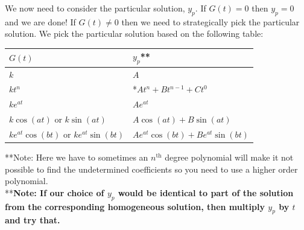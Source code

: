 We now need to consider the particular solution, $y_p$. If $G(t)=0$ then $y_p=0$ and we are done! If $G(t) \neq 0$ then we need to strategically pick the particular solution. We pick the particular solution based on the following table:

\begin{center}
{\renewcommand{\arraystretch}{2}
\begin{tabular}{|l|l|}
\hline
\Large{$G(t)$} & \Large{$y_p$}** \\ \hline
$k$ & $A$ \\ \hline
$kt^n$ & *$At^n+Bt^{n-1}+Ct^0$ \\ \hline
$ke^{at}$ & $Ae^{at}$ \\ \hline
$k\cos(at)$ or $k\sin(at)$ & $A\cos(at)+B\sin(at)$ \\ \hline
$ke^{at}\cos(bt)$ or $ke^{at}\sin(bt)$ & $Ae^{at}\cos(bt)+Be^{at}\sin(bt)$ \\ \hline
\end{tabular}
}

**Note: Here we have to sometimes an $n^{\text{th}}$ degree polynomial will make it not possible to find the undetermined coefficients so you need to use a higher order polynomial. \\
**\textbf{Note: If our choice of $y_p$ would be identical to part of the solution from the corresponding homogeneous solution, then multiply $y_p$ by $t$ and try that.}
\end{center}

\newpage


